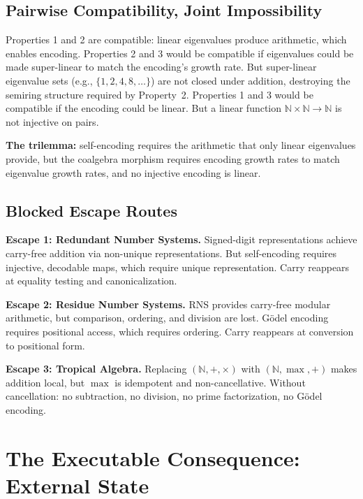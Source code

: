 \documentclass[11pt,a4paper]{article}
\theoremstyle{definition}
\theoremstyle{remark}
\newcommand{\N}{\mathbb{N}}
\begin{document}
\subsection{Pairwise Compatibility, Joint Impossibility}

Properties 1 and 2 are compatible: linear eigenvalues produce arithmetic,
which enables encoding. Properties 2 and 3 would be compatible if
eigenvalues could be made super-linear to match the encoding's growth rate.
But super-linear eigenvalue sets (e.g., $\{1, 2, 4, 8, \ldots\}$) are not
closed under addition, destroying the semiring structure required by
Property~2. Properties 1 and 3 would be compatible if the encoding could be
linear. But a linear function $\N \times \N \to \N$ is not injective on
pairs.

\textbf{The trilemma:} self-encoding requires the arithmetic that only
linear eigenvalues provide, but the coalgebra morphism requires encoding
growth rates to match eigenvalue growth rates, and no injective encoding is
linear.

\subsection{Blocked Escape Routes}

\textbf{Escape 1: Redundant Number Systems.} Signed-digit representations
\cite{avizienis1961} achieve carry-free addition via non-unique
representations. But self-encoding requires injective, decodable maps, which
require unique representation. Carry reappears at equality testing and
canonicalization.

\textbf{Escape 2: Residue Number Systems.} RNS provides carry-free
modular arithmetic, but comparison, ordering, and division are lost.
G\"odel encoding requires positional access, which requires ordering.
Carry reappears at conversion to positional form.

\textbf{Escape 3: Tropical Algebra.} Replacing $(\N, +, \times)$ with
$(\N, \max, +)$ makes addition local, but $\max$ is idempotent and
non-cancellative. Without cancellation: no subtraction, no division, no
prime factorization, no G\"odel encoding.

\section{The Executable Consequence: External State}
\label{sec:external-state}
\end{document}

